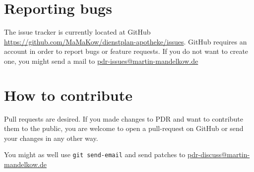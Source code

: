 \section{Reporting bugs}
The issue tracker is currently located at GitHub \url{https://github.com/MaMaKow/dienstplan-apotheke/issues}.
GitHub requires an account in order to report bugs or feature requests. If you do not want to create one, you might send a mail to \href{mailto:pdr-issues@martin-mandelkow.de}{pdr-issues@martin-mandelkow.de}

\section{How to contribute}
Pull requests are desired. If you made changes to PDR and want to contribute them to the public, you are welcome to open a pull-request on GitHub or send your changes in any other way.

You might as well use \lstinline|git send-email| and send patches to \href{mailto:pdr-discuss@martin-mandelkow.de}{pdr-discuss@martin-mandelkow.de}
